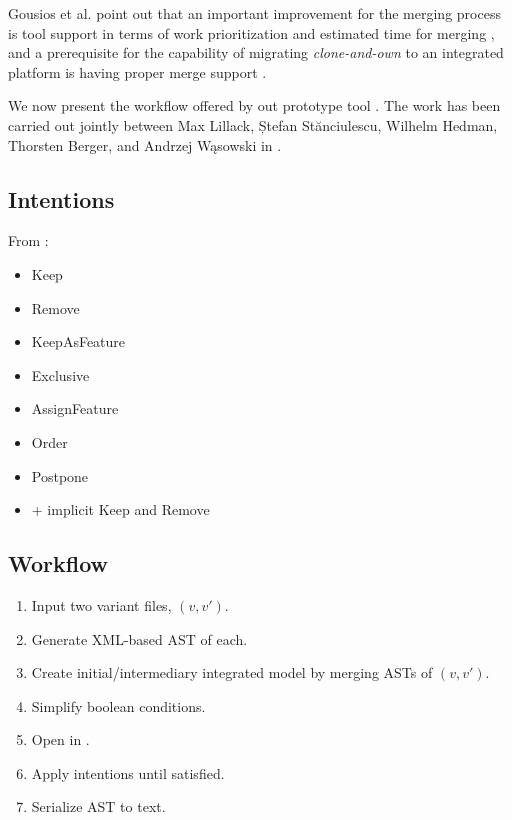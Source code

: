 Gousios et al. point out that an important improvement for the merging process is tool support in terms of work prioritization and estimated time for merging \cite{gousios2015}, and a prerequisite for the capability of migrating \textit{clone-and-own} to an integrated platform is having proper merge support \cite{antkiewicz2014flexible}.

We now present the workflow offered by out prototype tool \tooln. The work has been carried out jointly between Max Lillack, Ștefan St\u{a}nciulescu, Wilhelm Hedman, Thorsten Berger, and Andrzej W\k{a}sowski in \cite{lillack2017intentions}.

\subsection{Intentions}
From \cite{lillack2017intentions}:
\begin{itemize}
    \item{Keep}
    \item{Remove}
    \item{KeepAsFeature}
    \item{Exclusive}
    \item{AssignFeature}
    \item{Order}
    \item{Postpone}
    \item{+ implicit Keep and Remove}
\end{itemize}

\subsection{Workflow}
\begin{enumerate}
    \item Input two variant files, $(v, v')$. 
    \item Generate XML-based AST of each.
    \item Create initial/intermediary integrated model by merging ASTs of $(v, v')$.
    \item Simplify boolean conditions.
    \item Open in \tooln.
    \item Apply intentions until satisfied.
    \item Serialize AST to text.
\end{enumerate}
